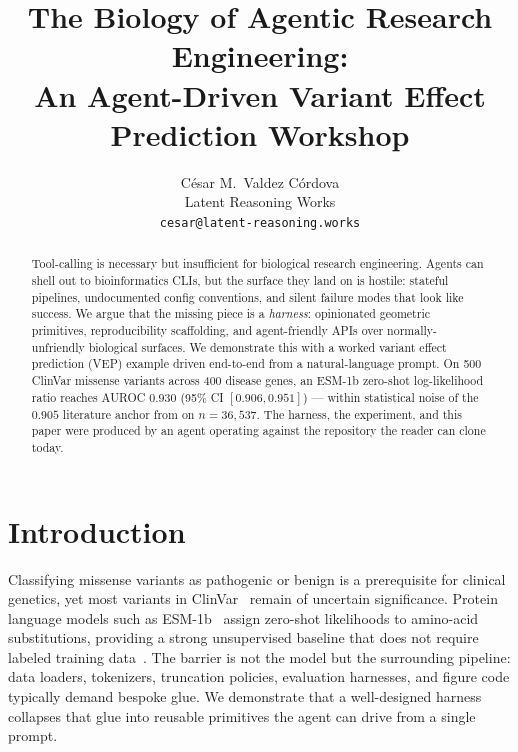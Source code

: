 \documentclass{article}
\title{The Biology of Agentic Research Engineering: \\
       An Agent-Driven Variant Effect Prediction Workshop}
\author{%
  C\'esar M.\ Valdez C\'ordova \\
  Latent Reasoning Works \\
  \texttt{cesar@latent-reasoning.works} \\
}
\begin{document}
\maketitle

\begin{abstract}
Tool-calling is necessary but insufficient for biological research engineering.
Agents can shell out to bioinformatics CLIs, but the surface they land on is
hostile: stateful pipelines, undocumented config conventions, and silent
failure modes that look like success. We argue that the missing piece is a
\emph{harness}: opinionated geometric primitives, reproducibility scaffolding,
and agent-friendly APIs over normally-unfriendly biological surfaces. We
demonstrate this with a worked variant effect prediction (VEP) example driven
end-to-end from a natural-language prompt. On 500 ClinVar missense variants
across 400 disease genes, an ESM-1b zero-shot log-likelihood ratio reaches
AUROC $0.930$ (95\% CI $[0.906, 0.951]$) --- within statistical noise of the
$0.905$ literature anchor from \citet{brandes2023} on $n{=}36{,}537$. The
harness, the experiment, and this paper were produced by an agent operating
against the repository the reader can clone today.
\end{abstract}


\section{Introduction}
\label{sec:intro}

Classifying missense variants as pathogenic or benign is a prerequisite for
clinical genetics, yet most variants in ClinVar~\citep{landrum2018clinvar}
remain of uncertain significance. Protein language models such as
ESM-1b~\citep{rives2021esm} assign zero-shot likelihoods to amino-acid
substitutions, providing a strong unsupervised baseline that does not require
labeled training data~\citep{brandes2023}. The barrier is not the model but
the surrounding pipeline: data loaders, tokenizers, truncation policies,
evaluation harnesses, and figure code typically demand bespoke glue. We
demonstrate that a well-designed harness collapses that glue into reusable
primitives the agent can drive from a single prompt.
\end{document}
